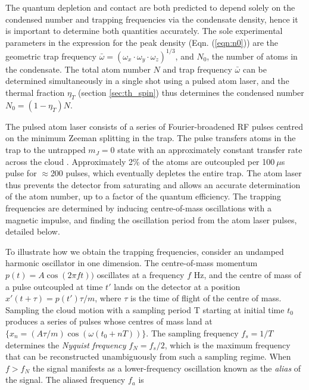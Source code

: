    The quantum depletion and contact are both predicted to depend solely on the condensed number and trapping frequencies via the condensate density, hence it is important to determine both quantities accurately. 
    The sole experimental parameters in the expression for the peak density (Eqn. (\ref{eqn:n0})) are the geometric trap frequency $\bar{\omega} = \left(\omega_x\cdot\omega_y\cdot\omega_z\right)^{1/3}$, and $N_0$, the number of atoms in the condensate. 
    The total atom number $N$ and trap frequency $\bar{\omega}$ can be determined simultaneously in a single shot using a pulsed atom laser, and the thermal fraction $\eta_T$ (section \ref{sec:th_spin}) thus determines the condensed number $N_0 = (1-\eta_T)N$. 

	The pulsed atom laser consists of a series of Fourier-broadened RF pulses centred on the minimum Zeeman splitting in the trap. 
	The pulse transfers atoms in the trap to the untrapped $m_J=0$ state with an approximately constant transfer rate across the cloud \cite{Manning10,Henson18_BCR}. 
	Approximately 2\% of the atoms are outcoupled per 100$~\mu$s pulse for $\approx$200 pulses, which eventually depletes the entire trap. 
	The atom laser thus prevents the detector from saturating and allows an accurate determination of the atom number, up to a factor of the quantum efficiency. 
	The trapping frequencies are determined by inducing centre-of-mass oscillations with a magnetic impulse, and finding the oscillation period from the atom laser pulses, detailed below.

	To illustrate how we obtain the trapping frequencies, consider an undamped harmonic oscillator in one dimension. The centre-of-mass momentum $p(t) = A \cos(2\pi f t))$ oscillates at a frequency $f$ Hz, and the centre of mass of a pulse outcoupled at time $t'$ lands on the detector at a position $x'(t+\tau) = p(t')\tau/m$, where $\tau$ is the time of flight of the centre of mass. Sampling the cloud motion with a sampling period T starting at initial time $t_0$ produces a series of pulses whose centres of mass land at $\{x_n = (A\tau/m) \cos(\omega(t_0+nT))\}$. The sampling frequency $f_s=1/T$ determines the \emph{Nyquist frequency} $f_N=f_s/2$, which is the maximum frequency that can be reconstructed unambiguously from such a sampling regime. When $f>f_N$ the signal manifests as a lower-frequency oscillation known as the \emph{alias} of the signal. The aliased frequency $f_a$ is

